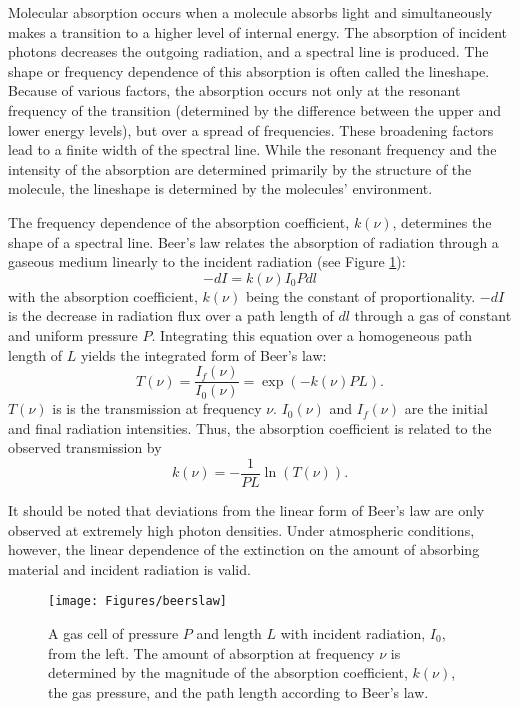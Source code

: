 \documentclass[11pt]{article}
\begin{document}
Molecular absorption occurs when a molecule absorbs light and 
simultaneously makes a transition to a higher level of internal 
energy.  The absorption of incident photons decreases the outgoing 
radiation, and a spectral line is produced.  The shape or frequency 
dependence of this absorption is often called the lineshape.  Because 
of various factors, the absorption occurs not only at the resonant 
frequency of the transition (determined by the difference between the 
upper and lower energy levels), but over a spread of frequencies.  
These broadening factors lead to a finite width of the spectral 
line.  While the resonant frequency and the intensity of the 
absorption are determined primarily by the structure of the molecule, the 
lineshape is determined by the molecules' environment.  

The frequency dependence of the absorption coefficient, $k(\nu)$, 
determines the shape of a spectral line.  Beer's law relates the 
absorption of radiation through a gaseous medium linearly to the incident 
radiation (see Figure \ref{fig:beers_law}):
\begin{equation}
   -dI = k(\nu)I_{0}P dl
\label{eqn:blaw1}
\end{equation}
with the absorption coefficient, $k(\nu)$ being the constant of
proportionality.  $-dI$ is the decrease in radiation flux over a path 
length of $dl$ through a gas of constant and uniform pressure $P$.  
Integrating this equation over a homogeneous path length of $L$ yields 
the integrated form of Beer's law:
\begin{equation}
 T(\nu)=\frac{I_f(\nu)}{I_0(\nu)}=\exp\left(-k(\nu)P L\right).
\label{eqn:blaw2}
\end{equation}
$T(\nu)$ is is the transmission at frequency $\nu$. $I_{0}(\nu)$ and
$I_f(\nu)$ are the initial and final radiation intensities.  Thus, the 
absorption coefficient is related to the observed transmission by 
\begin{equation}
 k(\nu)=-\frac{1}{P L}\ln\left(T(\nu)\right).
\end{equation}

It should be noted that deviations from the linear form of Beer's law are
only observed at extremely high photon densities.  Under atmospheric
conditions, however, the linear dependence of the extinction on the amount 
of absorbing material and incident radiation is valid. 

\begin{figure}
 \begin{center}
  \texttt{[image: Figures/beerslaw]}\end{center}
  \caption[An illustration of Beer's law.]{A gas cell of pressure $P$ and 
    length $L$ with incident radiation,
    $I_{0}$, from the left.  The amount of absorption at frequency $\nu$ is
    determined by the magnitude of the absorption coefficient, $k(\nu)$,
    the gas pressure, and the path length according to Beer's law.}
  \label{fig:beers_law}
\end{figure}
\end{document}
